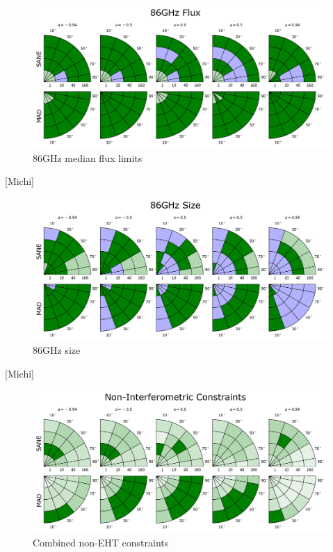 \begin{figure}
  \centering
  \includegraphics[width=\columnwidth]{./figures/86GHz_flux_Constraints.png}
  \caption{86GHz median flux limits}
  \label{fig:cmp_86ghz_flux}
\end{figure}

[Michi]


\begin{figure}
  \centering
  \includegraphics[width=\columnwidth]{./figures/86GHz_size_Constraints.png}
  \caption{86GHz size}
  \label{fig:cmp_86ghz_size}
\end{figure}

[Michi]


\begin{figure}
  \centering
  \includegraphics[width=\columnwidth]{./figures/Non_Interferometric_Constraints.png}
  \caption{Combined non-EHT constraints}
  \label{fig:non_eht_cuts}
\end{figure}

